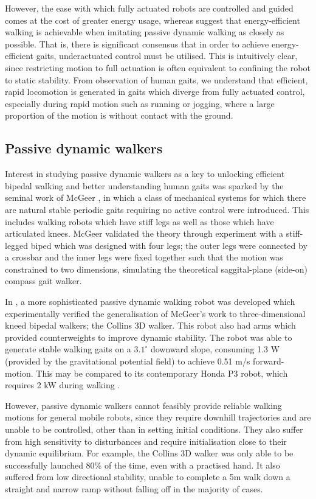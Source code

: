 However, the ease with which fully actuated robots are controlled and guided comes at the cost of greater energy usage, whereas \cite{mcgeer1990passive, asano2007dynamic, byl2008approximate} suggest that energy-efficient walking is achievable when imitating passive dynamic walking as closely as possible. That is, there is significant consensus that in order to achieve energy-efficient gaits, underactuated control must be utilised. This is intuitively clear, since restricting motion to full actuation is often equivalent to confining the robot to static stability. From observation of human gaits, we understand that efficient, rapid locomotion is generated in gaits which diverge from fully actuated control, especially during rapid motion such as running or jogging, where a large proportion of the motion is without contact with the ground.

\subsection{Passive dynamic walkers}
Interest in studying passive dynamic walkers as a key to unlocking efficient bipedal walking and better understanding human gaits was sparked by the seminal work of McGeer \cite{mcgeer1990passive}, in which a class of mechanical systems for which there are natural stable periodic gaits requiring no active control were introduced. This includes walking robots which have stiff legs as well as those which have articulated knees. McGeer validated the theory through experiment with a stiff-legged biped which was designed with four legs; the outer legs were connected by a crossbar and the inner legs were fixed together such that the motion was constrained to two dimensions, simulating the theoretical saggital-plane (side-on) compass gait walker.

In \cite{collins2001three}, a more sophisticated passive dynamic walking robot was developed which experimentally verified the generalisation of McGeer's work to three-dimensional kneed bipedal walkers; the Collins 3D walker. This robot also had arms which provided counterweights to improve dynamic stability. The robot was able to generate stable walking gaits on a $3.1^{\circ}$ downward slope, consuming 1.3 W (provided by the gravitational potential field) to achieve 0.51 m/s forward-motion. This may be compared to its contemporary Honda P3 robot, which requires 2 kW during walking \cite{collins2001three}.

However, passive dynamic walkers cannot feasibly provide reliable walking motions for general mobile robots, since they require downhill trajectories and are unable to be controlled, other than in setting initial conditions. They also suffer from high sensitivity to disturbances and require initialisation close to their dynamic equilibrium. For example, the Collins 3D walker was only able to be successfully launched 80\% of the time, even with a practised hand. It also suffered from low directional stability, unable to complete a 5m walk down a straight and narrow ramp without falling off in the majority of cases.

